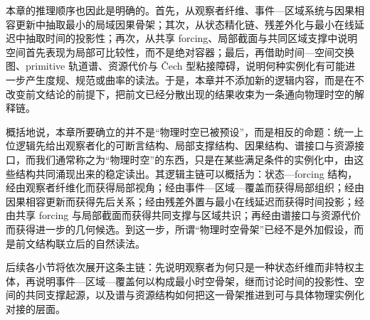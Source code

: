 本章的推理顺序也因此是明确的。首先，从观察者纤维、事件—区域系统与因果相容更新中抽取最小的局域因果骨架；其次，从状态精化链、残差外化与最小在线延迟中抽取时间的投影性；再次，从共享 forcing、局部截面与共同区域支撑中说明空间首先表现为局部可比较性，而不是绝对容器；最后，再借助时间—空间交换图、primitive 轨道谱、资源代价与 \v{C}ech 型粘接障碍，说明何种实例化有可能进一步产生度规、规范或曲率的读法。于是，本章并不添加新的逻辑内容，而是在不改变前文结论的前提下，把前文已经分散出现的结果收束为一条通向物理时空的解释链。

概括地说，本章所要确立的并不是“物理时空已被预设”，而是相反的命题：统一上位逻辑先给出观察者化的可断言结构、局部支撑结构、因果结构、谱接口与资源接口，而我们通常称之为“物理时空”的东西，只是在某些满足条件的实例化中，由这些结构共同涌现出来的稳定读出。其逻辑主链可以概括为：状态—forcing 结构，经由观察者纤维化而获得局部视角；经由事件—区域—覆盖而获得局部组织；经由因果相容更新而获得先后关系；经由残差外置与最小在线延迟而获得时间投影；经由共享 forcing 与局部截面而获得共同支撑与区域共识；再经由谱接口与资源代价而获得进一步的几何候选。到这一步，所谓“物理时空骨架”已经不是外加假设，而是前文结构联立后的自然读法。

后续各小节将依次展开这条主链：先说明观察者为何只是一种状态纤维而非特权主体，再说明事件—区域—覆盖何以构成最小时空骨架，继而讨论时间的投影性、空间的共同支撑起源，以及谱与资源结构如何把这一骨架推进到可与具体物理实例化对接的层面。
